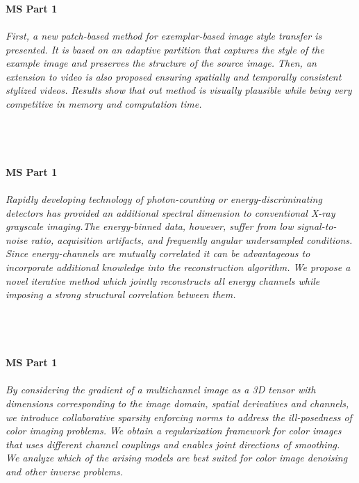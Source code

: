 \begin{multicols}{2}
    \\
    \\\\
    \noindent\textbf{MS Part 1}\\
\\  
    \textit{First, a new patch-based method for exemplar-based image style transfer is presented. It is based on an adaptive partition that captures the style of the example image and preserves the structure of the source image.
Then, an extension to video is also proposed ensuring spatially and temporally consistent stylized videos. Results show that out method is visually plausible while being very competitive in memory and computation time.}\\
\\ 
    \\
    \\\\
    \noindent\textbf{MS Part 1}\\
\\  
    \textit{Rapidly developing technology of photon-counting or energy-discriminating detectors has provided an additional spectral dimension to conventional X-ray grayscale imaging.The energy-binned data, however, suffer from low signal-to-noise ratio, acquisition artifacts, and frequently angular undersampled conditions. Since energy-channels are mutually correlated it can be advantageous to incorporate additional knowledge into the reconstruction algorithm. We propose a novel iterative method which jointly reconstructs all energy channels while imposing a strong structural correlation between them.}\\
\\ 
    \\
    \\\\
    \noindent\textbf{MS Part 1}\\
\\  
    \textit{By considering the gradient of a multichannel image as a 3D tensor with dimensions corresponding to the image domain, spatial derivatives and channels, we introduce collaborative sparsity enforcing norms to address the ill-posedness of color imaging problems. We obtain a regularization framework for color images that uses different channel couplings and enables joint directions of smoothing. We analyze which of the arising models are best suited for color image denoising and other inverse problems.}\\

\end{multicols}
